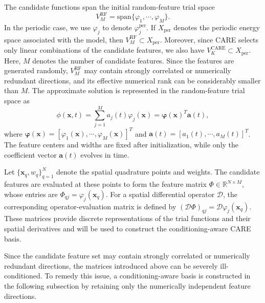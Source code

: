 \documentclass[10pt,reqno]{amsart}
\theoremstyle{remark}
\theoremstyle{definition}
\begin{document}
The candidate functions span the initial random-feature trial space
\begin{equation}
  V_{M}^{\text{RF}} = \mathrm{span}\{\varphi_1,\cdots,\varphi_M\}.
\end{equation}
In the periodic case, we use $\varphi_j$ to denote $\varphi_j^{\mathrm{per}}$. If $X_{\mathrm{per}}$ denotes the periodic energy space associated with the model, then $V_M^{\mathrm{RF}}\subset X_{\mathrm{per}}$. Moreover, since CARE selects only linear combinations of the candidate features, we also have $V_K^{\mathrm{CARE}}\subset X_{\mathrm{per}}$.
Here, $M$ denotes the number of candidate features. Since the features are generated randomly, $V_{M}^{\text{RF}}$ may contain strongly correlated or numerically redundant directions, and its effective numerical rank can be considerably smaller than $M$. The approximate solution is represented in the random-feature trial space as
\begin{equation}
  \phi(\boldsymbol{x},t) = \sum_{j=1}^{M} a_j(t) \varphi_j(\boldsymbol{x}) = \boldsymbol{\varphi}(\boldsymbol{x})^{T} \boldsymbol{a}(t),
\end{equation}
where $\boldsymbol{\varphi}(\boldsymbol{x}) = [\varphi_1(\boldsymbol{x}),\cdots,\varphi_M(\boldsymbol{x})]^{T}$ and $\boldsymbol{a}(t) = [a_1(t),\cdots,a_M(t)]^{T}$. The feature centers and widths are fixed after initialization, while only the coefficient vector $\boldsymbol{a}(t)$ evolves in time.

Let $\{\boldsymbol{x}_q,w_q\}_{q=1}^{N}$ denote the spatial quadrature points and weights. The candidate features are evaluated at these points to form the feature matrix $\Phi \in \mathbb{R}^{N \times M}$, whose entries are $\Phi_{qj} = \varphi_j(\boldsymbol{x}_q)$. For a spatial differential operator $\mathcal{D}$, the corresponding operator-evaluation matrix is defined by $(\mathcal{D}\Phi)_{qj} = \mathcal{D}\varphi_j(\boldsymbol{x}_q)$. These matrices provide discrete representations of the trial functions and their spatial derivatives and will be used to construct the conditioning-aware CARE basis.

Since the candidate feature set may contain strongly correlated or numerically redundant directions, the matrices introduced above can be severely ill-conditioned. To remedy this issue, a conditioning-aware basis is constructed in the following subsection by retaining only the numerically independent feature directions.
\end{document}
